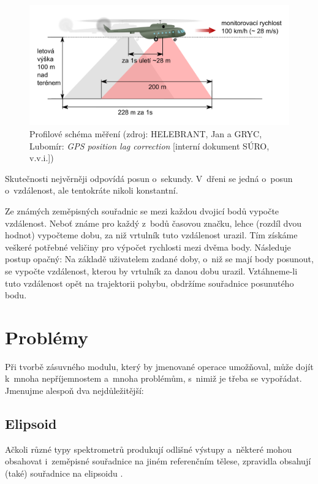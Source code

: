   \begin{figure}[H]
   \centering
	\includegraphics[scale=0.3]{./pictures/snimani-detail.png}
	\caption[Profilové schéma měření]{Profilové schéma měření
	(zdroj: HELEBRANT, Jan a GRYC, Lubomír: \textit{GPS position lag correction} [interní dokument
	SÚRO, v.v.i.])}
      \label{fig:mereni-profil}
  \end{figure}
  
Skutečnosti nejvěrněji odpovídá posun o~sekundy. V~dřeni se jedná o~posun o~vzdálenost, ale tentokráte
nikoli konstantní. 

Ze známých zeměpisných souřadnic se mezi každou dvojicí bodů vypočte vzdále\-nost. Neboť známe pro každý
z~bodů časovou značku, lehce (rozdíl dvou hodnot) vypočteme dobu, za niž vrtulník tuto vzdálenost urazil.
Tím získáme veškeré potřebné veličiny pro výpočet rychlosti mezi dvěma body. Následuje postup opačný:
Na zá\-kladě uživatelem zadané doby, o~niž se mají body posunout, se vypočte vzdálenost, kterou by
vrtulník za danou dobu urazil. Vztáhneme-li tuto vzdálenost opět na trajektorii pohybu, obdržíme
souřadnice posunutého bodu. 

\section{Problémy}
\label{problemy}

Při tvorbě zásuvného modulu, který by jmenované operace umožňoval, může dojít k~mnoha nepříjemnostem
a~mnoha problémům, s~nimiž je třeba se vypořádat. Jmenujme alespoň dva nejdůležitější: 

\subsection{Elipsoid}
\label{elipsoid}

Ačkoli různé typy spektrometrů produkují odlišné výstupy a~některé mohou obsahovat i~zeměpisné souřadnice
na jiném referenčním tělese, zpravidla obsahují (také) souřadnice na elipsoidu . 

